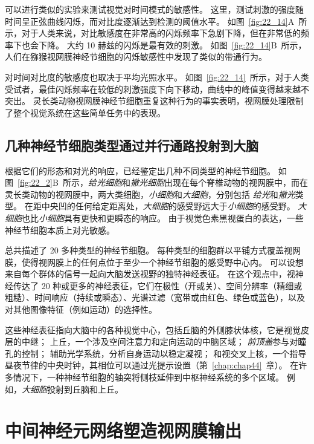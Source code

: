 \begin{proposition}[人类感知的时空敏感性]
	\quad \quad 可以进行类似的实验来测试视觉对时间模式的敏感性。
	这里，测试刺激的强度随时间呈正弦曲线闪烁，而对比度逐渐达到检测的阈值水平。
	如图~\ref{fig:22_14}A~所示，对于人类来说，对比敏感度在非常高的闪烁频率下急剧下降，但在非常低的频率下也会下降。
	大约 10 赫兹的闪烁是最有效的刺激。
	如图~\ref{fig:22_14}B~所示，人们在猕猴视网膜神经节细胞的闪烁敏感性中发现了类似的带通行为。
	
	\quad \quad 对时间对比度的敏感度也取决于平均光照水平。
	如图~\ref{fig:22_14}~所示，对于人类受试者，最佳闪烁频率在较低的刺激强度下向下移动，曲线中的峰值变得越来越不突出。
	灵长类动物视网膜神经节细胞重复这种行为的事实表明，视网膜处理限制了整个视觉系统在这些简单任务中的表现。
	
\end{proposition}



\subsection{几种神经节细胞类型通过并行通路投射到大脑}

根据它们的形态和对光的响应，已经鉴定出几种不同类型的神经节细胞。
如图~\ref{fig:22_2}B~所示，\textit{给光细胞}和\textit{撤光细胞}出现在每个脊椎动物的视网膜中，而在灵长类动物的视网膜中，两大类细胞，\textit{小细胞}和\textit{大细胞}，分别包括 \textit{给光}和\textit{撤光}类型。
在距中央凹的任何给定距离处，\textit{大细胞}的感受野远大于\textit{小细胞}的感受野。
\textit{大细胞}也比\textit{小细胞}具有更快和更瞬态的响应。
由于视觉色素黑视蛋白的表达，一些神经节细胞本质上对光敏感。


总共描述了 20 多种类型的神经节细胞。
每种类型的细胞群以平铺方式覆盖视网膜，使得视网膜上的任何点位于至少一个神经节细胞的感受野中心内。
可以设想来自每个群体的信号一起向大脑发送视野的独特神经表征。
在这个观点中，视神经传达了 20 种或更多的神经表征，它们在极性（开或关）、空间分辨率（精细或粗糙）、时间响应（持续或瞬态）、光谱过滤（宽带或由红色、绿色或蓝色），以及对其他图像特征（例如运动）的选择性。


这些神经表征指向大脑中的各种视觉中心，包括丘脑的外侧膝状体核，它是视觉皮层的中继；
上丘，一个涉及空间注意力和定向运动的中脑区域；
\textit{前顶盖}参与对瞳孔的控制； 
辅助光学系统，分析自身运动以稳定凝视；
和视交叉上核，一个指导昼夜节律的中央时钟，其相位可以通过光提示设置（第~\ref{chap:chap44}~章）。 
在许多情况下，一种神经节细胞的轴突将侧枝延伸到中枢神经系统的多个区域。
例如，\textit{大细胞}投射到丘脑和上丘。



\section{中间神经元网络塑造视网膜输出}

